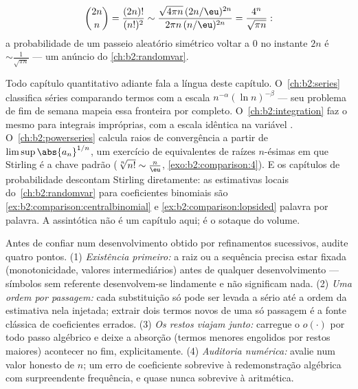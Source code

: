 \begin{example}\label{ex:b2:comparison:centralbinomial}
\[
\binom{2n}{n} = \frac{(2n)!}{(n!)^2}
\sim \frac{\sqrt{4\pi n}\,(2n/\eu)^{2n}}{2\pi n\,(n/\eu)^{2n}}
= \frac{4^n}{\sqrt{\pi n}} :
\]
a probabilidade de um passeio aleatório simétrico voltar a $0$ no instante
$2n$ é $\sim \frac{1}{\sqrt{\pi n}}$ --- um anúncio do
\cref{ch:b2:randomvar}.
\end{example}

\begin{remark}\label{rem:b2:comparison:perspectives}
Todo capítulo quantitativo adiante fala a língua deste
capítulo. O~\cref{ch:b2:series} classifica séries comparando
termos com a escala $n^{-\alpha}(\ln n)^{-\beta}$ --- seu
problema de fim de semana mapeia essa fronteira por completo.
O~\cref{ch:b2:integration} faz o mesmo para integrais impróprias,
com a escala idêntica na variável .
O~\cref{ch:b2:powerseries} calcula raios de convergência a partir de
$\limsup\abs{a_n}^{1/n}$, um exercício de equivalentes de raízes
$n$-ésimas em que Stirling é a chave padrão ($\sqrt[n]{n!}
\sim \frac n\eu$, \cref{exo:b2:comparison:4}). E os
capítulos de probabilidade descontam Stirling diretamente: as estimativas
locais do~\cref{ch:b2:randomvar} para coeficientes binomiais
são \cref{ex:b2:comparison:centralbinomial} e
\cref{ex:b2:comparison:lopsided} palavra por palavra. A assintótica não é
um capítulo aqui; é o sotaque do volume.
\end{remark}

\begin{method}\label{met:b2:comparison:checklist}
Antes de confiar num desenvolvimento obtido por refinamentos sucessivos, audite quatro pontos.
(1) \emph{Existência primeiro:} a raiz ou a sequência precisa estar fixada
(monotonicidade, valores intermediários) antes de qualquer desenvolvimento
--- símbolos sem referente desenvolvem-se lindamente e não significam
nada. (2) \emph{Uma ordem por passagem:} cada substituição só pode
ser levada a sério até a ordem da estimativa nela injetada; extrair
dois termos novos de uma só passagem é a fonte clássica de coeficientes
errados. (3) \emph{Os restos viajam junto:} carregue o
$o(\cdot)$ por todo passo algébrico e deixe a absorção
(termos menores engolidos por restos maiores) acontecer no
fim, explicitamente. (4) \emph{Auditoria numérica:} avalie num
valor honesto de $n$; um erro de coeficiente sobrevive à
redemonstração algébrica com surpreendente frequência, e quase nunca sobrevive à
aritmética.
\end{method}

